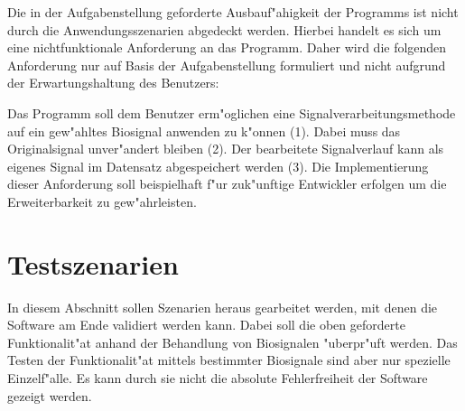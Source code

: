 Die in der Aufgabenstellung geforderte Ausbauf"ahigkeit der Programms ist nicht durch die Anwendungsszenarien abgedeckt werden.
Hierbei handelt es sich um eine nichtfunktionale Anforderung an das Programm.
Daher wird die folgenden Anforderung nur auf Basis der Aufgabenstellung formuliert und nicht aufgrund der Erwartungshaltung des Benutzers:
\begin{enumerate}[resume]
	 Das Programm soll dem Benutzer erm"oglichen eine Signalverarbeitungsmethode auf ein gew"ahltes Biosignal anwenden zu k"onnen (1).
							Dabei muss das Originalsignal unver"andert bleiben (2).
							Der bearbeitete Signalverlauf kann als eigenes Signal im Datensatz abgespeichert werden (3).
							Die Implementierung dieser Anforderung soll beispielhaft f"ur zuk"unftige Entwickler erfolgen um die Erweiterbarkeit zu gew"ahrleisten.
\end{enumerate}

\section{Testszenarien}
\label{chap:testszenarien}

In diesem Abschnitt sollen Szenarien heraus gearbeitet werden, mit denen die Software am Ende validiert werden kann.
Dabei soll die oben geforderte Funktionalit"at anhand der Behandlung von Biosignalen "uberpr"uft werden.
Das Testen der Funktionalit"at mittels bestimmter Biosignale sind aber nur spezielle Einzelf"alle.
Es kann durch sie nicht die absolute Fehlerfreiheit der Software gezeigt werden.


